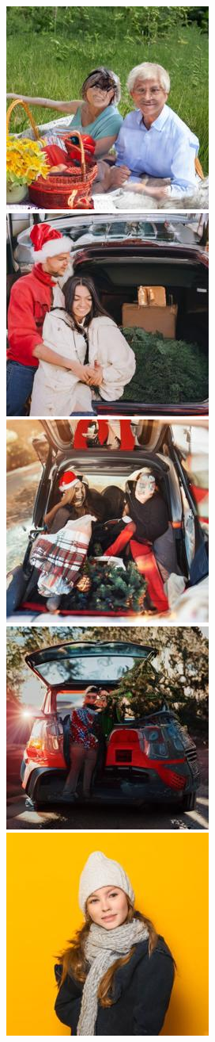 \begin{figure}[h!]
\begin{subfigure}[t]{0.32\linewidth}
    	\includegraphics[width=0.32\linewidth]{figs/samples_appendix_4/base_cfg_2_ode_prompt_51_image_2.jpg}\\ 
    	\includegraphics[width=0.32\linewidth]{figs/samples_appendix_4/base_cfg_2_ode_prompt_58_image_0.jpg}\;%
    	\includegraphics[width=0.32\linewidth]{figs/samples_appendix_4/base_cfg_2_ode_prompt_58_image_1.jpg}\;%
    	\includegraphics[width=0.32\linewidth]{figs/samples_appendix_4/base_cfg_2_ode_prompt_58_image_2.jpg}\\ 
    	\includegraphics[width=0.32\linewidth]{figs/samples_appendix_4/base_cfg_2_ode_prompt_61_image_0.jpg}\;%

\end{subfigure}
\end{figure}
